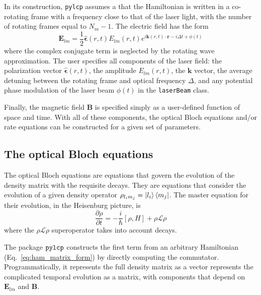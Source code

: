 \documentclass[final,5p,times,twocolumn]{elsarticle}
\begin{document}
In its construction, {\tt pylcp} assumes a that the Hamiltonian is written in a co-rotating frame with a frequency close to that of the laser light, with the number of rotating frames equal to $N_m-1$.  The electric field has the form
\begin{equation}
	\mathbf{E}_{lm} = \frac{1}{2}\hat{\boldsymbol{\epsilon}}(r, t) E_{lm}(r, t)e^{i\mathbf{k}(r,t)\cdot\mathbf{r}-i \Delta t + \phi(t)}
\end{equation}
where the complex conjugate term is neglected by the rotating wave approximation.  The user specifies all components of the laser field: the polarization vector $\hat{\boldsymbol{\epsilon}}(r, t)$, the amplitude $E_{lm}(r, t)$, the $\mathbf{k}$ vector, the average detuning between the rotating frame and optical frequency $\Delta$,  and any potential phase modulation of the laser beam $\phi(t)$ in the {\tt laserBeam} class.

Finally, the magnetic field $\mathbf{B}$ is specified simply as a user-defined function  of space and time.  With all of these components, the optical Bloch equations and/or rate equations can be constructed for a given set of parameters.

\subsection{The optical Bloch equations}
The optical Bloch equations are equations that govern the evolution of the density matrix with the requisite decays.  They are equations that consider the evolution of a given density operator $\rho_{l_im_j} = \ket{l_i}\Bra{m_j}$.  The master equation for their evolution, in the Heisenburg picture, is
\begin{equation}
	\frac{\partial \rho}{\partial t} = -\frac{i}{\hbar}[\rho, H] + \rho\mathcal{L}\rho
\end{equation}
where the $\rho\mathcal{L}\rho$ superoperator takes into account decays.

The package ${\tt pylcp}$ constructs the first term from an arbitrary Hamiltonian (Eq.~\ref{eq:ham_matrix_form}) by directly computing the commutator.  Programmatically, it  represents the full density matrix as a vector represents the complicated temporal evolution as a matrix, with components that depend on $\mathbf{E}_{lm}$ and $\mathbf{B}$.  
\end{document}

